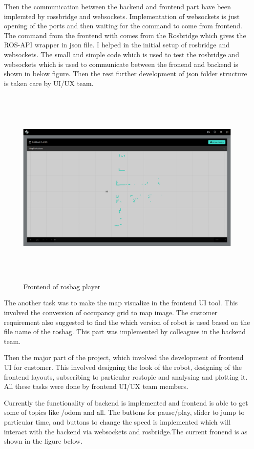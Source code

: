 Then the communication between the backend and frontend part have been implemted by rossbridge and websockets. Implementation of websockets is just opening of the ports and then waiting for the command to come from frontend. The command from the frontend with comes from the Rosbridge which gives the ROS-API wrapper in json file. I helped in the initial setup of rosbridge and websockets. The small and simple code which is used to test the rosbridge and websockets which is used to communicate between the fronend and backend is shown in below figure.  Then the rest further development of json folder structure is taken care by UI/UX team.
\pagebreak
\begin{figure}[h]
	\begin{center}
		\includegraphics[height=10cm,width=\linewidth]{images/frontend-rosbag.png}
		\caption{Frontend of rosbag player}
	\end{center}
\end{figure}
 
The another task was to make the map visualize in the frontend UI tool. This involved the conversion of occupancy grid to map image. The customer requirement also suggested to find the which version of robot is used based on the file name of the rosbag. This part was implemented by colleagues in the backend team. 

Then the major part of the project, which involved the development of frontend UI for customer. This involved designing the look of the robot, designing of the frontend layouts, subscribing to particular rostopic and analysing and plotting it. All these tasks were done by frontend UI/UX team members.

Currently the functionality of backend is implemented and frontend is able to get some of topics like /odom and all. The buttons for pause/play, slider to jump to particular time, and buttons to change the speed is implemented which will interact with the backend via websockets and rosbridge.The current fronend is as shown in the figure below.